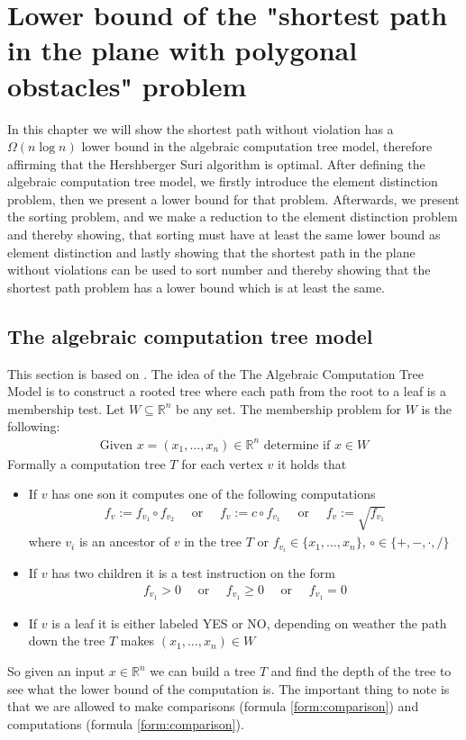 \chapter{Lower bound of the "shortest path in the plane with polygonal obstacles" problem}
\label{chapter:lowerbound}
In this chapter we will show the shortest path without violation has a
$\Omega{(n\log n)}$ lower bound in the algebraic computation tree model,
therefore affirming that the Hershberger Suri algorithm is optimal.  After
defining the algebraic computation tree model, we firstly introduce the element
distinction problem, then we present a lower bound for that problem.
Afterwards,
we present the sorting problem, and we make a reduction to the element
distinction problem and thereby showing, that sorting must have at least the
same lower bound as element distinction and lastly showing that the shortest
path in the plane without violations can be used to sort number and thereby
showing that the shortest path problem has a lower bound which is at least the
same.
\section{The algebraic computation tree model}
This section is based on \cite{DBLP:conf/stoc/Ben-Or83}.
The idea of the The Algebraic Computation Tree Model is to construct a rooted
tree where each path from the root to a leaf is a membership test.
Let $W \subseteq \mathbb{R}^n$ be any set. The membership problem for $W$ is
the following:
\begin{align}
	\text{Given } x = (x_1,\dots,x_n) \in \mathbb{R}^n \text{ determine if } x\in W
\end{align}
Formally a computation tree $T$ for each vertex $v$ it holds that
\begin{itemize}
  \item If $v$ has one son it computes one of the following computations
			\begin{align}
				f_v:=f_{v_1} \circ f_{v_2}\quad \text{ or }\quad
				f_v:=c \circ f_{v_1}\quad \text{ or }\quad
				f_v:=\sqrt{f_{v_1}}
				\label{form:computation}
			\end{align}
  	 where $v_i$ is an ancestor of $v$ in the tree $T$ or $f_{v_i}\in
  	 \{x_1,\dots,x_n\}$, $\circ \in \{+,-,\cdot,/\}$
   \item If $v$ has two children it is a test instruction on the form
		\begin{align}
			 f_{v_1}>0\quad \text{ or }\quad
			 f_{v_1}\geq 0\quad \text{ or }\quad
			 f_{v_1}= 0
			 \label{form:comparison}
		\end{align}
   \item If $v$ is a leaf it is either labeled YES or NO, depending on
  	 weather the path down the tree $T$ makes $(x_1,\dots,x_n)\in W$
\end{itemize}
So given an input $x\in \mathbb{R}^n$ we can build a tree $T$ and find the
depth of the tree to see what the lower bound of the computation is.
The important thing to note is that we are allowed to make comparisons (formula
\ref{form:comparison}) and computations (formula \ref{form:comparison}).

